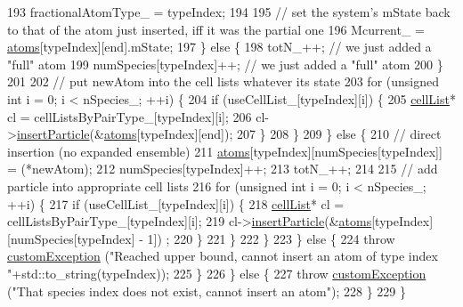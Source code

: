 \begin{DoxyCode}
193                     fractionalAtomType\_ = typeIndex;
194 
195                     \textcolor{comment}{// set the system's mState back to that of the atom just inserted, iff it was the
       partial one}
196                     Mcurrent\_ = \hyperlink{classsim_system_a90421b19082f7fb8fc23b7264b1161e4}{atoms}[typeIndex][end].mState;
197                 \} \textcolor{keywordflow}{else} \{
198                     totN\_++; \textcolor{comment}{// we just added a "full" atom}
199                     numSpecies[typeIndex]++; \textcolor{comment}{// we just added a "full" atom}
200                 \}
201 
202                 \textcolor{comment}{// put newAtom into the cell lists whatever its state}
203                 \textcolor{keywordflow}{for} (\textcolor{keywordtype}{unsigned} \textcolor{keywordtype}{int} i = 0; i < nSpecies\_; ++i) \{
204                     \textcolor{keywordflow}{if} (useCellList\_[typeIndex][i]) \{
205                         \hyperlink{classcell_list}{cellList}* cl = cellListsByPairType\_[typeIndex][i];
206                         cl->\hyperlink{classcell_list_a56c0012eed483e47248f9065bfc70fce}{insertParticle}(&\hyperlink{classsim_system_a90421b19082f7fb8fc23b7264b1161e4}{atoms}[typeIndex][end]);
207                     \}
208                 \}
209             \} \textcolor{keywordflow}{else} \{
210                 \textcolor{comment}{// direct insertion (no expanded ensemble)}
211                 \hyperlink{classsim_system_a90421b19082f7fb8fc23b7264b1161e4}{atoms}[typeIndex][numSpecies[typeIndex]] = (*newAtom);
212                 numSpecies[typeIndex]++;
213                 totN\_++;
214 
215                 \textcolor{comment}{// add particle into appropriate cell lists}
216                 \textcolor{keywordflow}{for} (\textcolor{keywordtype}{unsigned} \textcolor{keywordtype}{int} i = 0; i < nSpecies\_; ++i) \{
217                     \textcolor{keywordflow}{if} (useCellList\_[typeIndex][i]) \{
218                         \hyperlink{classcell_list}{cellList}* cl = cellListsByPairType\_[typeIndex][i];
219                         cl->\hyperlink{classcell_list_a56c0012eed483e47248f9065bfc70fce}{insertParticle}(&\hyperlink{classsim_system_a90421b19082f7fb8fc23b7264b1161e4}{atoms}[typeIndex][numSpecies[typeIndex] - 1])
      ;
220                     \}
221                 \}
222             \}
223         \} \textcolor{keywordflow}{else} \{
224             \textcolor{keywordflow}{throw} \hyperlink{classcustom_exception}{customException} (\textcolor{stringliteral}{"Reached upper bound, cannot insert an atom of type index
       "}+std::to\_string(typeIndex));
225         \}
226     \} \textcolor{keywordflow}{else} \{
227         \textcolor{keywordflow}{throw} \hyperlink{classcustom_exception}{customException} (\textcolor{stringliteral}{"That species index does not exist, cannot insert an atom"});
228     \}
229 \}
\end{DoxyCode}
